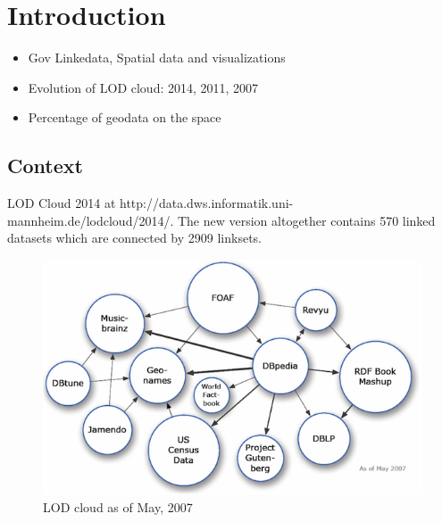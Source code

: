 \chapter{Introduction}
\label{intro}

\begin{itemize}
\item Gov Linkedata, Spatial data and visualizations
\item Evolution of LOD cloud: 2014, 2011, 2007
\item Percentage of geodata on the space
\end{itemize}

\section{Context}
\label{sec:context}


LOD Cloud 2014 at http://data.dws.informatik.uni-mannheim.de/lodcloud/2014/. The new version altogether contains 570 linked datasets which are connected by 2909 linksets.

\begin{figure}[ht!]
\includegraphics[scale=0.9]{img/lod-cloud2007.png}
\caption{LOD cloud as of May, 2007}
\label{fig:lodcloud2007}
\end{figure}

